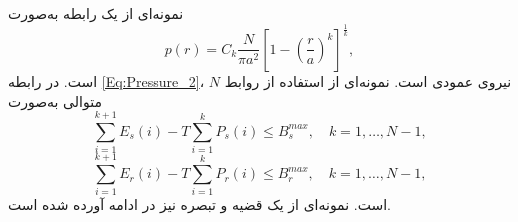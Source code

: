 نمونه‌ای از یک رابطه به‌صورت
\begin{equation}
p\left( r \right) = {C_k}\frac{N}{{\pi {a^2}}}{\left[{1 - {{\left( {\frac{r}{a}} \right)}^k}} \right]^{\frac{1}{k}}},
\label{Eq:Pressure_2}
\end{equation}
است. در رابطه
\ref{Eq:Pressure_2}،
$N$
نیروی عمودی است. نمونه‌ای از استفاده از روابط متوالی به‌صورت
\begin{equation}
\sum \limits_{i = 1}^{k + 1} {E_s}\left( i \right) - T \sum \limits_{i = 1}^k {P_s}\left( i \right) \le B_s^{max},\quad k = 1, \ldots ,N - 1,
\label{Eq:batterysource_2}
\end{equation}\vspace{-\baselineskip}
\begin{equation}
\sum \limits_{i = 1}^{k + 1} {E_r}\left( i \right) - T \sum \limits_{i = 1}^k {P_r}\left( i \right) \le B_r^{max},\quad k = 1, \ldots ,N - 1,
\label{Eq:batteryrellay_2}
\end{equation}
است. نمونه‌ای از یک قضیه و تبصره نیز در ادامه آورده شده است.
